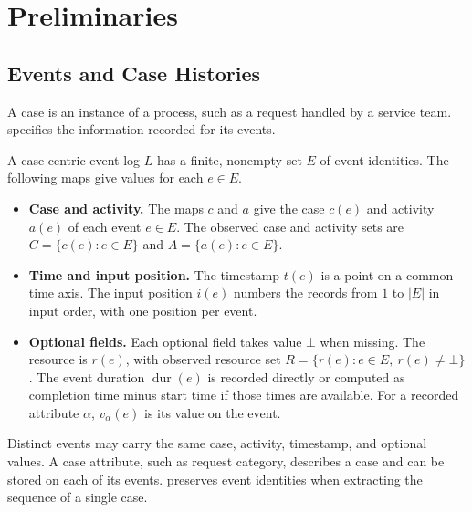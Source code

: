 \section{Preliminaries}\label{sec:preliminaries}

\subsection{Events and Case Histories}

A case is an instance of a process, such as a request handled by a service team.  specifies the information recorded for its events.

\begin{Definition}\label{def:event-log}
A case-centric event log $L$ has a finite, nonempty set $E$ of event identities. The following maps give values for each $e\in E$.
\begin{itemize}
  \item \textbf{Case and activity.} The maps $c$ and $a$ give the case $c(e)$ and activity $a(e)$ of each event $e\in E$. The observed case and activity sets are $C=\{c(e):e\in E\}$ and $A=\{a(e):e\in E\}$.
  \item \textbf{Time and input position.} The timestamp $t(e)$ is a point on a common time axis. The input position $i(e)$ numbers the records from $1$ to $|E|$ in input order, with one position per event.
  \item \textbf{Optional fields.} Each optional field takes value $\bot$ when missing. The resource is $r(e)$, with observed resource set $R=\{r(e):e\in E,\ r(e)\ne\bot\}$. The event duration $\operatorname{dur}(e)$ is recorded directly or computed as completion time minus start time if those times are available. For a recorded attribute $\alpha$, $v_\alpha(e)$ is its value on the event.
\end{itemize}
\end{Definition}

Distinct events may carry the same case, activity, timestamp, and optional values. A case attribute, such as request category, describes a case and can be stored on each of its events.  preserves event identities when extracting the sequence of a single case.


